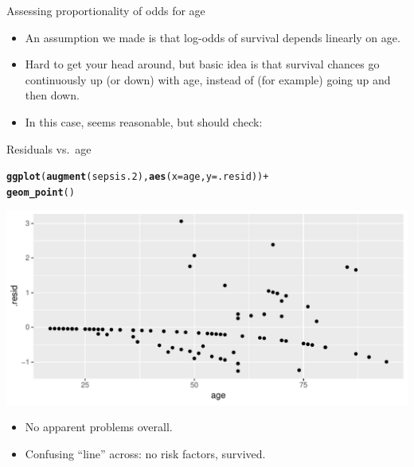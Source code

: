 \documentclass[unknownkeysallowed]{beamer}\usepackage[]{graphicx}\usepackage[]{color}
\makeatletter
\def\maxwidth{ %
  \ifdim\Gin@nat@width>\linewidth
    \linewidth
  \else
    \Gin@nat@width
  \fi
}
\newcommand{\hlopt}[1]{\textcolor[rgb]{0,0,0}{#1}}%
\newcommand{\hlstd}[1]{\textcolor[rgb]{0.345,0.345,0.345}{#1}}%
\newcommand{\hlkwc}[1]{\textcolor[rgb]{0.333,0.667,0.333}{#1}}%
\newcommand{\hlkwd}[1]{\textcolor[rgb]{0.737,0.353,0.396}{\textbf{#1}}}%
\newenvironment{kframe}{%
 \def\at@end@of@kframe{}%
 \ifinner\ifhmode%
  \def\at@end@of@kframe{\end{minipage}}%
  \begin{minipage}{\columnwidth}%
 \fi\fi%
 \def\FrameCommand##1{\hskip\@totalleftmargin \hskip-\fboxsep
 \colorbox{shadecolor}{##1}\hskip-\fboxsep
     \hskip-\linewidth \hskip-\@totalleftmargin \hskip\columnwidth}%
 \MakeFramed {\advance\hsize-\width
   \@totalleftmargin\z@ \linewidth\hsize
   \@setminipage}}%
 {\par\unskip\endMakeFramed%
 \at@end@of@kframe}
\newenvironment{knitrout}{}{} %
\makeatother
\begin{document}
\begin{frame}[fragile]{Assessing proportionality of odds for age}
  \begin{itemize}
  \item An assumption we made is that log-odds of survival depends
    linearly on age.
  \item Hard to get your head around, but 
    basic idea is that survival chances go continuously up (or down)
    with age, instead of (for example) going up and then down.
  \item In this case, seems reasonable, but should check:

  \end{itemize}
    

\end{frame}
 

\begin{frame}[fragile]{Residuals vs.\ age}

 
\begin{knitrout}
\color{fgcolor}\begin{kframe}
\begin{alltt}
\hlkwd{ggplot}\hlstd{(}\hlkwd{augment}\hlstd{(sepsis.2),}\hlkwd{aes}\hlstd{(}\hlkwc{x}\hlstd{=age,}\hlkwc{y}\hlstd{=.resid))}\hlopt{+}
  \hlkwd{geom_point}\hlstd{()}
\end{alltt}
\end{kframe}
\includegraphics[width=\maxwidth]{figure/virtusentella-1} 

\end{knitrout}
  
  
\begin{itemize}
\item No apparent problems overall.
\item Confusing ``line'' across: no risk factors, survived. 
\end{itemize}
  
\end{frame}
\end{document}

